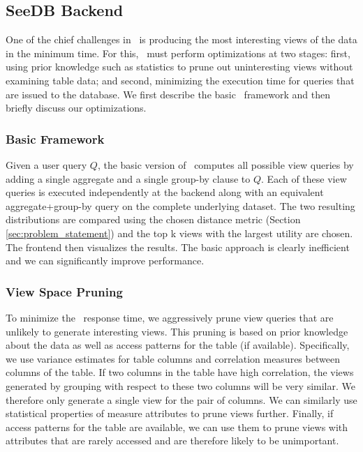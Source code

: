 \subsection{SeeDB Backend}
\label{subsec:seedb_backend}

One of the chief challenges in \SeeDB\ is producing the most interesting views
of the data in the minimum time. For this, \SeeDB\ must perform optimizations
at two stages: first, using prior knowledge such as statistics to prune out
uninteresting views without examining table data; and second, minimizing the
execution time for queries that are issued to the database. We first describe
the basic \SeeDB\ framework and then briefly discuss our optimizations.

\subsubsection{Basic Framework}
\label{subsubsec:basic_framework}

Given a user query $Q$, the basic version of \SeeDB\ computes all possible view
queries by adding a single aggregate and a single group-by clause to $Q$. Each
of these view queries is executed independently at the backend along with an
equivalent aggregate+group-by query on the complete underlying dataset. The two
resulting distributions are compared using the chosen distance metric (Section
\ref{sec:problem_statement}) and the top k views with the largest utility are
chosen. The frontend then visualizes the results. The basic approach is clearly 
inefficient and we can significantly improve performance.

\subsubsection{View Space Pruning}
\label{subsubsec:view_space_pruning}

To minimize the \SeeDB\ response time, we aggressively prune view queries that
are unlikely to generate interesting views. This pruning is based on prior
knowledge about the data as well as access patterns for the table (if
available). Specifically, we use variance estimates for table columns and
correlation measures between columns of the table. If two columns in the table
have high correlation, the views generated by grouping with respect to these two
columns will be very similar. We therefore only generate a single view for the
pair of columns. We can similarly use statistical properties of measure
attributes to prune views further. Finally, if access patterns for the table are
available, we can use them to prune views with attributes that are
rarely accessed and are therefore likely to be unimportant.

